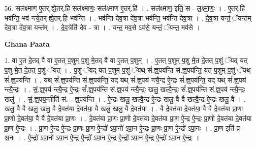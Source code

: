 \documentclass[17pt]{extarticle}
\begin{document}
56. सल॑क्ष्माण ए॒तर् ह्ये॒तर्.हि॒ सल॑क्ष्माणः॒ सल॑क्ष्माण ए॒तर्.हि॑ । . सल॑क्ष्माण॒ इति॒ स - ल॒क्ष्मा॒णः॒ । . ए॒तर्.हि॒ भव॑न्ति॒ भव॑ न्त्ये॒तर् ह्ये॒तर्.हि॒ भव॑न्ति । . भव॑न्ति देव॒त्रा दे॑व॒त्रा भव॑न्ति॒ भव॑न्ति देव॒त्रा । . दे॒व॒त्रा यन्तं॒ ॅयन्त॑म् देव॒त्रा दे॑व॒त्रा यन्त᳚म् । . दे॒व॒त्रेति॑ देव - त्रा । . यन्त॒ मव॒से ऽव॑से॒ यन्तं॒ ॅयन्त॒ मव॑से । \newline

\textbf{Ghana Paata } \newline

1. वा ए॒त दे॒तद् वै वा ए॒तत् प॒शुम् प॒शु मे॒तद् वै वा ए॒तत् प॒शुम् । . ए॒तत् प॒शुम् प॒शु मे॒त दे॒तत् प॒शुं ॅयद् यत् प॒शु मे॒त दे॒तत् प॒शुं ॅयत् । . प॒शुं ॅयद् यत् प॒शुम् प॒शुं ॅयथ् सं᳚.ज्ञ्॒पय॑न्ति सं.ज्ञ्॒पय॑न्ति॒ यत् प॒शुम् प॒शुं ॅयथ् 
सं᳚.ज्ञ्॒पय॑न्ति । . यथ् सं᳚.ज्ञ्॒पय॑न्ति सं.ज्ञ्॒पय॑न्ति॒ यद् यथ् सं᳚.ज्ञ्॒पय॑ न्त्यै॒न्द्र ऐ॒न्द्रः सं᳚.ज्ञ्॒पय॑न्ति॒ यद् यथ् 
सं᳚.ज्ञ्॒पय॑ न्त्यै॒न्द्रः । . सं॒.ज्ञ्॒पय॑ न्त्यै॒न्द्र ऐ॒न्द्रः सं᳚.ज्ञ्॒पय॑न्ति सं.ज्ञ्॒पय॑ न्त्यै॒न्द्रः खलु॒ खल्वै॒न्द्रः 
सं᳚.ज्ञ्॒पय॑न्ति सं.ज्ञ्॒पय॑ न्त्यै॒न्द्रः खलु॑ । . सं॒.ज्ञ्॒पय॒न्तीति॑ सं. - ज्ञ्॒पय॑न्ति । . ऐ॒न्द्रः खलु॒ खल्वै॒न्द्र ऐ॒न्द्रः खलु॒ वै वै खल्वै॒न्द्र ऐ॒न्द्रः खलु॒ वै । . खलु॒ वै वै खलु॒ खलु॒ वै दे॒वत॑या दे॒वत॑या॒ वै खलु॒ खलु॒ वै दे॒वत॑या । . वै दे॒वत॑या दे॒वत॑या॒ वै वै दे॒वत॑या प्रा॒णः प्रा॒णो दे॒वत॑या॒ वै वै दे॒वत॑या प्रा॒णः । . दे॒वत॑या प्रा॒णः प्रा॒णो दे॒वत॑या दे॒वत॑या प्रा॒ण ऐ॒न्द्र ऐ॒न्द्रः प्रा॒णो दे॒वत॑या दे॒वत॑या प्रा॒ण ऐ॒न्द्रः । . प्रा॒ण ऐ॒न्द्र ऐ॒न्द्रः प्रा॒णः प्रा॒ण ऐ॒न्द्रो॑ ऽपा॒नो॑ ऽपा॒न ऐ॒न्द्रः प्रा॒णः प्रा॒ण ऐ॒न्द्रो॑ ऽपा॒नः । . प्रा॒ण इति॑ प्र - अ॒नः । . ऐ॒न्द्रो॑ ऽपा॒नो॑ ऽपा॒न ऐ॒न्द्र ऐ॒न्द्रो॑ ऽपा॒न ऐ॒न्द्र ऐ॒न्द्रो॑ ऽपा॒न ऐ॒न्द्र ऐ॒न्द्रो॑ ऽपा॒न ऐ॒न्द्रः । \newline
\end{document}

